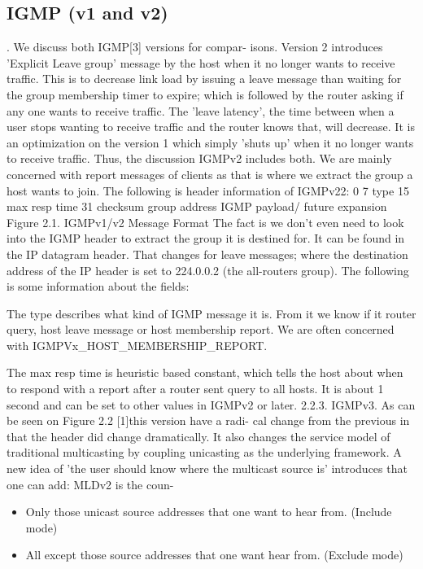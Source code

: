 \documentclass[11pt,left=2cm,bottom=2cm,oneside]{book}
\begin{document}
\subsection{IGMP (v1 and v2)}. We discuss both IGMP[3] versions for compar-
isons. Version 2 introduces 'Explicit Leave group' message by the host when it
no longer wants to receive traffic. This is to decrease link load by issuing a
leave
message than waiting for the group membership timer to expire; which is
followed
by the router asking if any one wants to receive traffic. The 'leave latency',
the
time between when a user stops wanting to receive traffic and the router knows
that, will decrease. It is an optimization on the version 1 which simply
'shuts up'
when it no longer wants to receive traffic. Thus, the discussion IGMPv2
includes
both. We are mainly concerned with report messages of clients as that is where
we extract the group a host wants to join. The following is header information
of
IGMPv22:
0
7
type
15
max resp time
31
checksum
group address
IGMP payload/ future expansion
Figure 2.1. IGMPv1/v2 Message Format
The fact is we don't even need to look into the IGMP header to extract the group
it is destined for. It can be found in the IP datagram header. That changes
for
leave messages; where the destination address of the IP header is set to
224.0.0.2
(the all-routers group). The following is some information about the fields:
\item The type describes what kind of IGMP message it is. From it we know
if it router query, host leave message or host membership report. We are
often concerned with IGMPV{x}\_HOST\_MEMBERSHIP\_REPORT.
\item The max resp time is heuristic based constant, which tells the host about
when to respond with a report after a router sent query to all hosts. It is
about 1 second and can be set to other values in IGMPv2 or later.
2.2.3. IGMPv3. As can be seen on Figure 2.2 [1]this version have a radi-
cal change from the previous in that the header did change dramatically. It
also
changes the service model of traditional multicasting by coupling unicasting
as the
underlying framework. A new idea of 'the user should know where the multicast
source is' introduces that one can add:
MLDv2 is the coun-
\begin{itemize}
\item Only those unicast source addresses that one want to hear from. (Include
mode)
\item All except those source addresses that one want hear from. (Exclude
mode)
\end{itemize}
\end{document}
